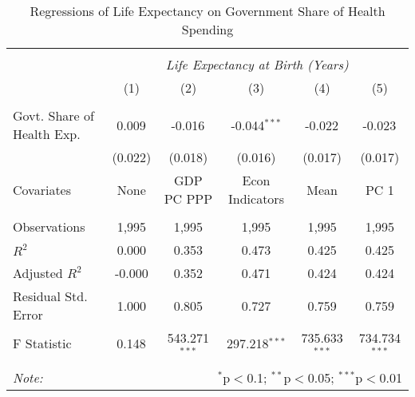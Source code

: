 \begin{table}[!htbp] \centering
  \caption{Regressions of Life Expectancy on Government Share of Health Spending \label{main_regs}}
\begin{tabular}{@{\extracolsep{5pt}}lccccc}
\\[-1.8ex]\hline
\hline \\[-1.8ex]
& \multicolumn{5}{c}{\textit{Life Expectancy at Birth (Years)}} \
\cr \
\\[-1.8ex] & (1) & (2) & (3) & (4) & (5) \\
\hline \\[-1.8ex]
 Govt. Share of Health Exp. & 0.009$^{}$ & -0.016$^{}$ & -0.044$^{***}$ & -0.022$^{}$ & -0.023$^{}$ \\
  & (0.022) & (0.018) & (0.016) & (0.017) & (0.017) \\
 Covariates & None & GDP PC PPP & Econ Indicators & Mean & PC 1 \\
\hline \\[-1.8ex]
 Observations & 1,995 & 1,995 & 1,995 & 1,995 & 1,995 \\
 $R^2$ & 0.000 & 0.353 & 0.473 & 0.425 & 0.425 \\
 Adjusted $R^2$ & -0.000 & 0.352 & 0.471 & 0.424 & 0.424 \\
 Residual Std. Error & 1.000 & 0.805 & 0.727 & 0.759 & 0.759  \\
 F Statistic & 0.148$^{}$  & 543.271$^{***}$  & 297.218$^{***}$  & 735.633$^{***}$  & 734.734$^{***}$  \\
\hline
\hline \\[-1.8ex]
\textit{Note:} & \multicolumn{5}{r}{$^{*}$p$<$0.1; $^{**}$p$<$0.05; $^{***}$p$<$0.01} \\
\end{tabular}
\end{table}